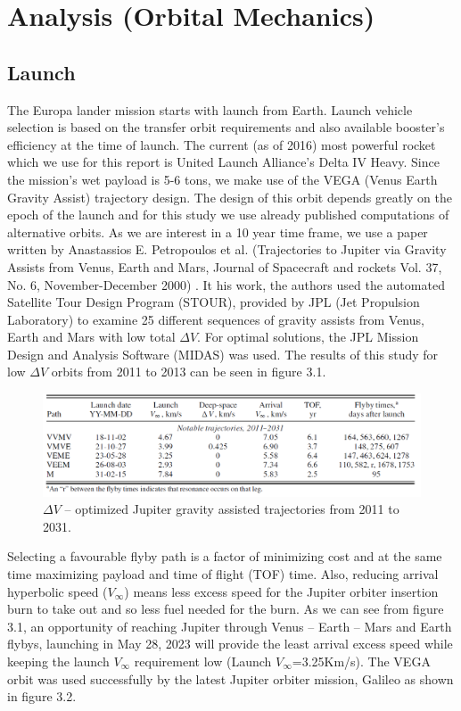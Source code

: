 \section{Analysis (Orbital Mechanics)}
\subsection{Launch}
The Europa lander mission starts with launch from Earth. Launch vehicle selection is based on the transfer orbit requirements and also available booster’s efficiency at the time of launch. The current (as of 2016) most powerful rocket which we use for this report is United Launch Alliance’s Delta IV Heavy. Since the mission’s wet payload is 5-6 tons, we make use of the VEGA (Venus Earth Gravity Assist) 
trajectory design. The design of this orbit depends greatly on the epoch of the launch and for this study we use already published computations of alternative orbits. As we are interest in a 10 year time frame, we use a paper written by Anastassios E. Petropoulos et al. (Trajectories to Jupiter via Gravity Assists from Venus, Earth and Mars, Journal of Spacecraft and rockets Vol. 37, No. 6, November-December 2000)
. It his work, the authors used the automated Satellite Tour Design Program (STOUR), provided by JPL (Jet Propulsion Laboratory) to examine 25 different sequences of gravity assists from Venus, Earth and Mars with low total $\Delta V$. For optimal solutions, the JPL Mission Design and Analysis Software (MIDAS) was used. The results of this study for low $\Delta V$ orbits from 2011 to 2013 can be seen in figure 3.1.
\begin{figure}[htb]
\centering
\includegraphics[width=1\textwidth]{figures/Orbiter/traj.png}
\caption{$\Delta V$ – optimized Jupiter gravity assisted trajectories from 2011 to 2031. \cite{petropoulos2000a}}
\end{figure}
Selecting a favourable flyby path is a factor of minimizing cost and at the same time maximizing payload and time of flight (TOF) time. Also, reducing arrival hyperbolic speed ($V_{\infty}$) means less excess speed for the Jupiter orbiter insertion burn to take out and so less fuel needed for the burn. As we can see from figure 3.1, an opportunity of reaching Jupiter through Venus – Earth – Mars and Earth flybys, launching in May 28, 2023 will provide the least arrival excess speed while keeping the launch $V_{\infty}$ requirement low (Launch $V_{\infty}$=3.25Km/s). The VEGA orbit was used successfully by the latest Jupiter orbiter mission, Galileo as shown in figure 3.2.
